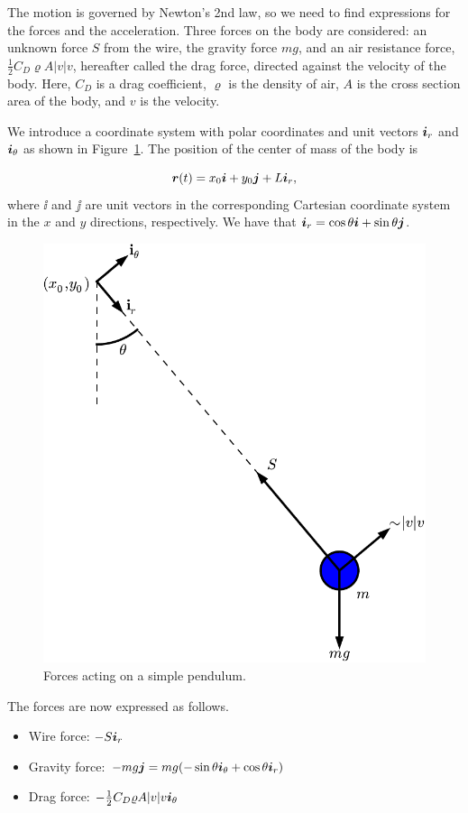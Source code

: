 \documentclass[%
oneside,                 %
final,                   %
10pt]{article}
\begin{document}
The motion is governed by Newton's 2nd law, so we need to find expressions
for the forces and the acceleration. Three forces on the body are
considered: an unknown force $S$ from the wire, the gravity force $mg$,
and an air resistance force, $\frac{1}{2}C_D\varrho A |v|v$,
hereafter called the drag force,
directed against the velocity of the body. Here, $C_D$ is a drag coefficient,
$\varrho$ is the density of air, $A$ is the cross section area of the body,
and $v$ is the velocity.

We introduce a coordinate system with polar coordinates and unit
vectors $\ir$ and $\ith$ as shown in Figure~\ref{vib:app:pendulum:fig_forces}.
The position of the center of mass of the body is

\[ \rpos(t) = x_0\ii + y_0\jj + L\ir,\]
where $\ii$ and $\jj$ are unit vectors in the corresponding Cartesian
coordinate system in the $x$ and $y$ directions, respectively. We have
that $\ir = \cos\theta\ii +\sin\theta\jj$.


\begin{figure}[!ht]  %
  \centerline{\includegraphics[width=0.5\linewidth]{fig-vib/pendulum_forces.pdf}}
  \caption{
  Forces acting on a simple pendulum. \label{vib:app:pendulum:fig_forces}
  }
\end{figure}


The forces are now expressed as follows.

\begin{itemize}
 \item Wire force: $-S\ir$

 \item Gravity force: $-mg\jj = mg(-\sin\theta\ith + \cos\theta\ir)$

 \item Drag force: $-\frac{1}{2}C_D\varrho A |v|v\ith$
\end{itemize}
\end{document}
